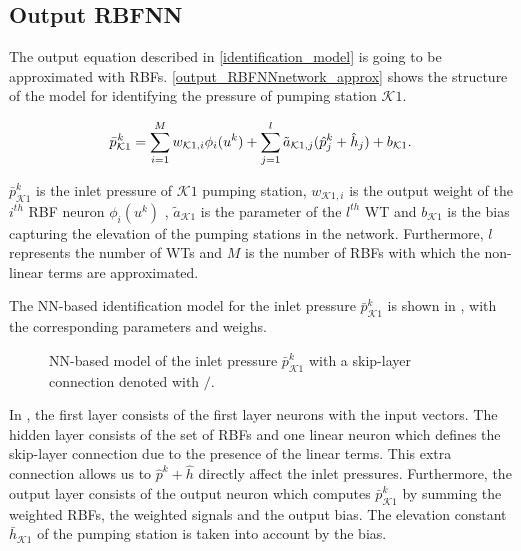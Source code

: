  \subsection{Output RBFNN}
\label{output_rbfnn}

The output equation described in \eqref{identification_model} is going to be approximated with RBFs. \eqref{output_RBFNNnetwork_approx} shows the structure of the model for identifying the pressure of pumping station $\mathcal{K}1$.

\vspace{-2mm}

  \begin{equation}
  \label{output_RBFNNnetwork_approx}
\bar{p}^{\hspace{0.2mm} k}_{\mathcal{K}1} = \sum_{i = 1}^M w_{\mathcal{K}1,i} \phi_{i}(u^k) + \sum_{j = 1}^l \tilde{a}_{\mathcal{K}1,j} (\hat{p}^{k}_{j} + \hat{h}_j) + b_{\mathcal{K}1}.
\end{equation}

$\bar{p}^{k}_{\mathcal{K}1}$ is the inlet pressure of $\mathcal{K}1$ pumping station, $w_{\mathcal{K}1,i}$ is the output weight of the $i^{th}$ RBF neuron $\phi_i(u^k)$ , $\tilde{a}_{\mathcal{K}1} $ is the parameter of the $l^{th}$ WT and $b_{\mathcal{K}1}$ is the bias capturing the elevation of the pumping stations in the network. Furthermore, $l$ represents the number of WTs and $M$ is the number of RBFs with which the non-linear terms are approximated. 

The NN-based identification model for the inlet pressure $\bar{p}^{k}_{\mathcal{K}1}$ is shown in , with the corresponding  parameters and weighs.

 \begin{figure}[H]
 \centering
 \hspace*{1.7cm} 
  \vspace{-8mm}
 \caption{NN-based model of the inlet pressure $\bar{p}^k_{\mathcal{K}1} $ with a skip-layer connection denoted with $/$.}
 \label{fig:nn_output}
 \end{figure}

 \vspace{-3mm}

 In , the first layer consists of the first layer neurons with the input vectors. The hidden layer consists of the set of RBFs and one linear neuron which defines the skip-layer connection due to the presence of the linear terms. This extra connection allows us to $\hat{p}^{k} \!+\! \hat{h}$ directly affect the inlet pressures. Furthermore, the output layer consists of the output neuron which computes $\bar{p}^{k}_{\mathcal{K}1}$ by summing the weighted RBFs, the weighted signals and the output bias. The elevation constant $\bar{h}_{\mathcal{K}1}$ of the pumping station is taken into account by the bias. 

